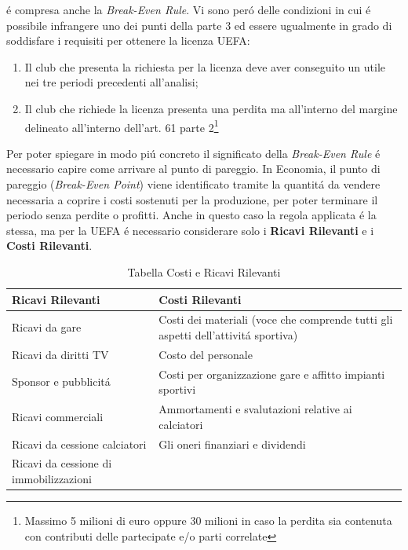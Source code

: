 \documentclass[
    corpo=12pt,
    oneside,
    evenboxes,
    tipotesi=triennale,
    stile=classica,
    oldstyle,
    autoretitolo,
    greek,
]{toptesi}
\begin{document}
\begin{interlinea}{1.5}
\'e compresa anche la \emph{Break-Even Rule}. Vi sono per\'o delle condizioni in cui \'e possibile infrangere uno dei punti della parte 3 
ed essere ugualmente in grado di soddisfare i requisiti per ottenere la licenza UEFA:
\begin{enumerate}
    \item Il club che presenta la richiesta per la licenza deve aver conseguito un utile nei tre periodi precedenti all'analisi;
    \item Il club che richiede la licenza presenta una perdita ma all'interno del margine delineato all'interno dell'art. 61 parte 2\footnote{Massimo 5 milioni di euro oppure 30 milioni in caso la perdita sia contenuta con contributi delle partecipate e/o parti correlate}
\end{enumerate}
Per poter spiegare in modo pi\'u concreto il significato della \emph{Break-Even Rule} \'e necessario capire come arrivare al punto di pareggio.
In Economia, il punto di pareggio (\emph{Break-Even Point}) viene identificato tramite la quantit\'a da vendere \linebreak necessaria a coprire i costi 
sostenuti per la produzione, per poter terminare il periodo senza perdite o profitti. Anche in questo caso la regola applicata \'e la stessa,
ma per la UEFA \'e necessario considerare solo i \textbf{Ricavi Rilevanti} e i \textbf{Costi Rilevanti}.
\newpage
\begin{table}
    \begin{tabularx}{\textwidth}{XX}
        \toprule
        \textbf{Ricavi Rilevanti} & \textbf{Costi Rilevanti} \\
        \midrule
        Ricavi da gare & Costi dei materiali (voce che comprende tutti gli aspetti dell'attivit\'a sportiva) \\
        \midrule
        Ricavi da diritti TV & Costo del personale \\
        \midrule
        Sponsor e pubblicit\'a & Costi per organizzazione gare e affitto impianti sportivi \\
        \midrule
        Ricavi commerciali & Ammortamenti e svalutazioni relative ai calciatori \\
        \midrule
        Ricavi da cessione calciatori & Gli oneri finanziari e dividendi \\
        \midrule
        Ricavi da cessione di immobilizzazioni & \\
        \bottomrule
    \end{tabularx}
    \caption{Tabella Costi e Ricavi Rilevanti}

\end{table}
\end{interlinea}
\end{document}
